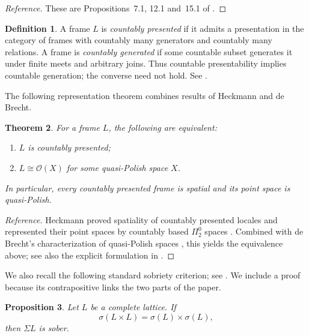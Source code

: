 \documentclass[11pt,reqno]{amsart}
\newtheorem{theorem}{Theorem}[section]
\newtheorem{proposition}[theorem]{Proposition}
\theoremstyle{definition}
\newtheorem{definition}[theorem]{Definition}
\numberwithin{equation}{section}
\newcommand{\OO}{\mathcal O}
\begin{document}
\begin{proof}[Reference]
These are Propositions~7.1, 12.1 and~15.1 of
\citep{deBrechtEtAl2019}.
\end{proof}

\begin{definition}\label{def:countably-presented}
A frame $L$ is \emph{countably presented} if it admits a presentation in
the category of frames with countably many generators and countably many
relations. A frame is \emph{countably generated} if some countable subset
generates it under finite meets and arbitrary joins. Thus countable
presentability implies countable generation; the converse need not hold.
See
\citep{deBrechtKawai2019,Heckmann2015}.
\end{definition}

The following representation theorem combines results of Heckmann and de Brecht.

\begin{theorem}\label{thm:cp-quasipolish}
For a frame $L$, the following are equivalent:
\begin{enumerate}
\item $L$ is countably presented;
\item $L\cong\OO(X)$ for some quasi-Polish space $X$.
\end{enumerate}
In particular, every countably presented frame is spatial and its point space
is quasi-Polish.
\end{theorem}

\begin{proof}[Reference]
Heckmann proved spatiality of countably presented locales and represented
their point spaces by countably based $\Pi^0_2$ spaces
\citep{Heckmann2015}.  Combined with de Brecht's characterization of
quasi-Polish spaces \citep{deBrecht2013}, this yields the equivalence above;
see also the explicit formulation in \citep{deBrechtKawai2019}.
\end{proof}

We also recall the following standard sobriety criterion; see
\citep[Corollary~II-1.12]{GierzEtAl2003}. We include a proof because its
contrapositive links the two parts of the paper.

\begin{proposition}\label{prop:joint-sup-sober}
Let $L$ be a complete lattice.  If
\[
  \sigma(L\times L)=\sigma(L)\times\sigma(L),
\]
then $\Sigma L$ is sober.
\end{proposition}
\end{document}
